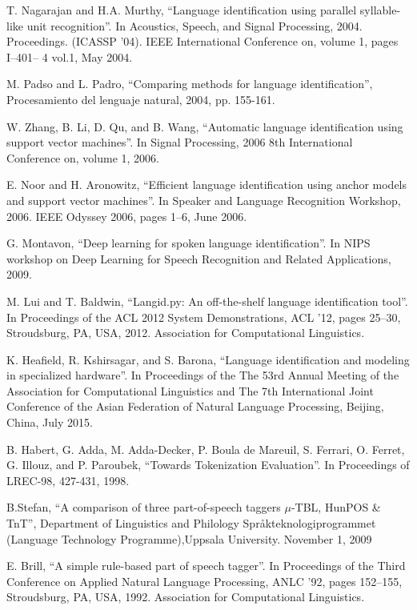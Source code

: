 \documentclass[runningheads,a4paper]{llncs}
\theoremstyle{break}
\begin{document}
\begin{thebibliography}{5}
T. Nagarajan and H.A. Murthy, ``Language identification using parallel syllable-like unit recognition''. In Acoustics, Speech, and Signal Processing, 2004. Proceedings. (ICASSP ’04). IEEE International Conference on, volume 1, pages I–401– 4 vol.1, May 2004.

M. Padso and L. Padro, ``Comparing methods for language identification'', Procesamiento del lenguaje natural, 2004, pp. 155-161.

W. Zhang, B. Li, D. Qu, and B. Wang, ``Automatic language identification using support vector machines''. In Signal Processing, 2006 8th International Conference on, volume 1, 2006.

E. Noor and H. Aronowitz, ``Efficient language identification using anchor models and support vector machines''. In Speaker and Language Recognition Workshop, 2006. IEEE Odyssey 2006, pages 1–6, June 2006.

G. Montavon, ``Deep learning for spoken language identification''. In NIPS workshop on Deep Learning for Speech Recognition and Related Applications, 2009.

M. Lui and T. Baldwin, ``Langid.py: An off-the-shelf language identification tool''. In Proceedings of the ACL 2012 System Demonstrations, ACL ’12, pages 25–30, Stroudsburg, PA, USA, 2012. Association for Computational Linguistics.

K. Heafield, R. Kshirsagar, and S. Barona, ``Language identification and modeling in specialized hardware''. In Proceedings of the The 53rd Annual Meeting of the Association for Computational Linguistics and The 7th International Joint Conference of the Asian Federation of Natural Language Processing, Beijing, China, July 2015.

B. Habert, G. Adda, M. Adda-Decker, P. Boula de Mareuil, S. Ferrari, O. Ferret, G. Illouz, and P. Paroubek, ``Towards Tokenization Evaluation''.
In Proceedings of LREC-98, 427-431, 1998.

B.Stefan, ``A comparison of three part-of-speech taggers $\mu$-TBL, HunPOS \& TnT'', Department of Linguistics and Philology Språkteknologiprogrammet
(Language Technology Programme),Uppsala University. November 1, 2009

E. Brill, ``A simple rule-based part of speech tagger''. In Proceedings of the Third Conference on Applied Natural Language Processing, ANLC ’92, pages 152–155, Stroudsburg, PA, USA, 1992. Association for Computational Linguistics.


\end{thebibliography}
\end{document}
